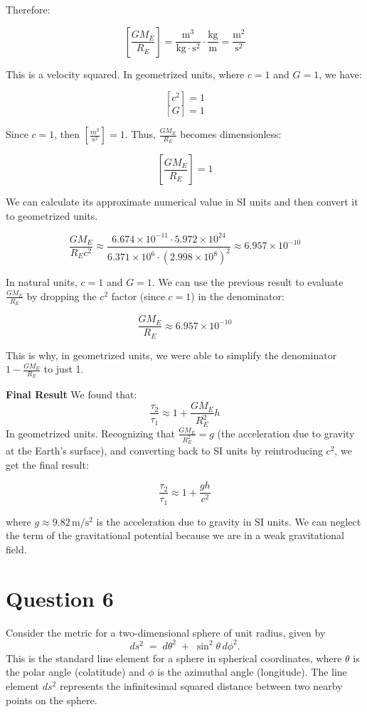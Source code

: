 Therefore:

\[
\left[\frac{GM_E}{R_E}\right] = \frac{\mathrm{m^3}}{\mathrm{kg \cdot s^2}} \cdot \frac{\mathrm{kg}}{\mathrm{m}} = \frac{\mathrm{m^2}}{\mathrm{s^2}}
\]

This is a velocity squared. In geometrized units, where \(c = 1\) and \(G = 1\), we have:

\[
[c^2] = 1
\]
\[
[G] = 1
\]

Since \(c=1\), then \(\left[\frac{m^2}{s^2}\right] = 1\). Thus, \(\frac{GM_E}{R_E}\) becomes dimensionless:

\[
\left[\frac{GM_E}{R_E}\right] = 1
\]

We can calculate its approximate numerical value in SI units and then convert it to geometrized units.

\[
\frac{GM_E}{R_E c^2} \approx \frac{6.674 \times 10^{-11} \cdot 5.972 \times 10^{24}}{6.371 \times 10^6 \cdot (2.998 \times 10^8)^2} \approx 6.957 \times 10^{-10}
\]

In natural units, \(c = 1\) and \(G = 1\). We can use the previous result to evaluate \(\frac{GM_E}{R_E}\) by dropping the \(c^2\) factor (since \(c = 1\)) in the denominator:

\[ \frac{GM_E}{R_E} \approx 6.957 \times 10^{-10} \]

This is why, in geometrized units, we were able to simplify the denominator \(1 - \frac{GM_E}{R_E}\) to just 1.

\textbf{Final Result}
We found that:
\[
\frac{\tau_2}{\tau_1} \approx 1 + \frac{GM_E}{R_E^2} h
\]
In geometrized units. Recognizing that \(\frac{GM_E}{R_E^2} = g\) (the acceleration due to gravity at the Earth's surface), and converting back to SI units by reintroducing \(c^2\), we get the final result:

\[
\frac{\tau_2}{\tau_1} \approx 1 + \frac{gh}{c^2}
\]

where \(g \approx 9.82 \, \mathrm{m/s^2}\) is the acceleration due to gravity in SI units. We can neglect the term of the gravitational potential because we are in a weak gravitational field.
\pagebreak


\section*{Question 6}
Consider the metric for a two-dimensional sphere of unit radius, given by
\[
ds^{2} \;=\; d\theta^{2} \;+\; \sin^{2}\theta\,d\phi^{2}.
\]
This is the standard line element for a sphere in spherical coordinates, where \(\theta\) is the polar angle (colatitude) and \(\phi\) is the azimuthal angle (longitude). The line element \(ds^2\) represents the infinitesimal squared distance between two nearby points on the sphere.


